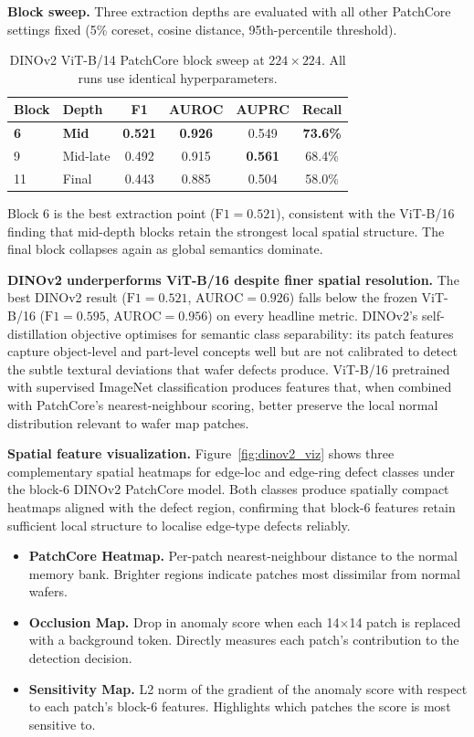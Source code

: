 \documentclass[11pt]{article}
\begin{document}
\textbf{Block sweep.}
Three extraction depths are evaluated with all other PatchCore settings fixed (5\% coreset, cosine distance, 95th-percentile threshold).

\begin{table}[H]
\centering
\caption{DINOv2 ViT-B/14 PatchCore block sweep at $224\!\times\!224$. All runs use identical hyperparameters.}
\label{tab:dinov2_block_sweep}
\begin{tabular}{llcccc}
\toprule
Block & Depth & F1 & AUROC & AUPRC & Recall \\
\midrule
\textbf{6}  & \textbf{Mid}      & \textbf{0.521} & \textbf{0.926} & 0.549 & \textbf{73.6\%} \\
9           & Mid-late          & 0.492          & 0.915          & \textbf{0.561} & 68.4\% \\
11          & Final             & 0.443          & 0.885          & 0.504 & 58.0\% \\
\bottomrule
\end{tabular}
\end{table}

Block 6 is the best extraction point ($\mathrm{F1}=0.521$), consistent with the ViT-B/16 finding that mid-depth blocks retain the strongest local spatial structure. The final block collapses again as global semantics dominate.

\textbf{DINOv2 underperforms ViT-B/16 despite finer spatial resolution.}
The best DINOv2 result ($\mathrm{F1}=0.521$, $\mathrm{AUROC}=0.926$) falls below the frozen ViT-B/16 ($\mathrm{F1}=0.595$, $\mathrm{AUROC}=0.956$) on every headline metric. DINOv2's self-distillation objective optimises for semantic class separability: its patch features capture object-level and part-level concepts well but are not calibrated to detect the subtle textural deviations that wafer defects produce. ViT-B/16 pretrained with supervised ImageNet classification produces features that, when combined with PatchCore's nearest-neighbour scoring, better preserve the local normal distribution relevant to wafer map patches.

\textbf{Spatial feature visualization.}
Figure~\ref{fig:dinov2_viz} shows three complementary spatial heatmaps for edge-loc and edge-ring defect classes under the block-6 DINOv2 PatchCore model. Both classes produce spatially compact heatmaps aligned with the defect region, confirming that block-6 features retain sufficient local structure to localise edge-type defects reliably.

\begin{itemize}
    \item \textbf{PatchCore Heatmap.} Per-patch nearest-neighbour distance to the normal memory bank. Brighter regions indicate patches most dissimilar from normal wafers.
    \item \textbf{Occlusion Map.} Drop in anomaly score when each 14$\times$14 patch is replaced with a background token. Directly measures each patch's contribution to the detection decision.
    \item \textbf{Sensitivity Map.} L2 norm of the gradient of the anomaly score with respect to each patch's block-6 features. Highlights which patches the score is most sensitive to.
\end{itemize}
\end{document}
